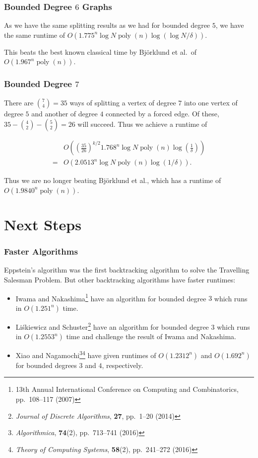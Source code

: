 \documentclass[]{beamer}
\DeclareMathOperator{\poly}{poly}
\begin{document}
\begin{frame}
\frametitle{Bounded Degree $6$ Graphs}
As we have the same splitting results as we had for bounded degree $5$, we have the same runtime of $O(1.775^n\log N\poly(n)\log(\log N/\delta))$.

This beats the best known classical time by Bj\"orklund et al.\ of $O(1.967^n\poly(n))$.
\end{frame}

\begin{frame}
\frametitle{Bounded Degree $7$}
There are $\binom{7}{4} = 35$ ways of splitting a vertex of degree $7$ into one vertex of degree $5$ and another of degree $4$ connected by a forced edge. Of these, $35 - \binom{4}{2} - \binom{5}{2} = 26$ will succeed. Thus we achieve a runtime of

\begin{align*}
&O\left(\left(\frac{35}{26}\right)^{k/2}1.768^n\log N\poly(n)\log\left(\frac{1}{\delta}\right)\right)\\
= &O(2.0513^n\log N\poly(n)\log(1/\delta)).
\end{align*}

Thus we are no longer beating Bj{\"o}rklund et al., which has a runtime of $O(1.9840^n\poly(n))$.
\end{frame}

\section{Next Steps}

\begin{frame}
\frametitle{Faster Algorithms}
Eppstein's algorithm was the first backtracking algorithm to solve the Travelling Salesman Problem. But other backtracking algorithms have faster runtimes:

\begin{itemize}
\item Iwama and Nakashima\footnote{13th Annual International Conference on Computing and Combinatorics, pp.\ 108--117 (2007)} have an algorithm for bounded degree $3$ which runs in $O(1.251^n)$ time.
\item Li\'{s}kiewicz and Schuster\footnote{{\em Journal of Discrete Algorithms}, {\bf 27}, pp.\ 1--20 (2014)} have an algorithm for bounded degree $3$ which runs in $O(1.2553^n)$ time and challenge the result of Iwama and Nakashima.
\item Xiao and Nagamochi\footnote{{\em Algorithmica}, {\bf 74}(2), pp.\ 713--741 (2016)}\footnote{{\em Theory of Computing Systems}, {\bf 58}(2), pp.\ 241--272 (2016)} have given runtimes of $O(1.2312^n)$ and $O(1.692^n)$ for bounded degrees $3$ and $4$, respectively.
\end{itemize}
\end{frame}
\end{document}

